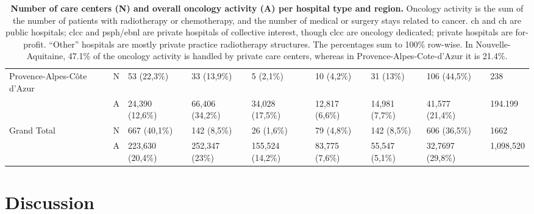 \begin{table}[H]
{\begin{tabular}{|l|l|l|l|l|l|l|l|l|}
            Provence-Alpes-Côte d'Azur                        & N               & 53 (22,3\%)                       & 33 (13,9\%)     & 5 (2,1\%)        &
            10 (4,2\%)                                        & 31 (13\%)       & 106 (44,5\%)                      & 238                                                                      \\
            ~                                                 & A               & 24,390 (12,6\%)                   & 66,406 (34,2\%) & 34,028 (17,5\%)  & 12,817
            (6,6\%)                                           & 14,981 (7,7\%)  & 41,577 (21,4\%)                   & 194.199                                                                  \\ \hline
            Grand Total                                       & N               & 667 (40,1\%)                      & 142 (8,5\%)     & 26 (1,6\%)       & 79 (4,8\%)     &
            142 (8,5\%)                                       & 606 (36,5\%)    & 1662                                                                                                         \\
            ~                                                 & A               & 223,630 (20,4\%)                  & 252,347 (23\%)  & 155,524 (14,2\%) & 83,775
            (7,6\%)                                           & 55,547 (5,1\%)  & 32,7697 (29,8\%)                  & 1,098,520                                                                \\ \hline
        \end{tabular}} \caption{ \textbf{Number of care centers (N) and overall
            oncology activity (A) per hospital type and region.} Oncology activity is
        the sum of the number of patients with radiotherapy or chemotherapy, and the
        number of medical or surgery stays related to cancer. \ac{ch} and \ac{ch}
        are public hospitals; \ac{clcc} and \ac{psph}/\ac{ebnl} are private
        hospitals of collective interest, though \acs{clcc} are oncology dedicated;
        private hospitals are for-profit. “Other” hospitals are mostly private
        practice radiotherapy structures. The percentages sum to 100\% row-wise. In
        Nouvelle-Aquitaine, 47.1\% of the oncology activity is handled by private
        care centers, whereas in Provence-Alpes-Cote-d’Azur it is 21.4\%. }
    \label{table:oncology-activity-per-region}
\end{table}

\section{Discussion}

